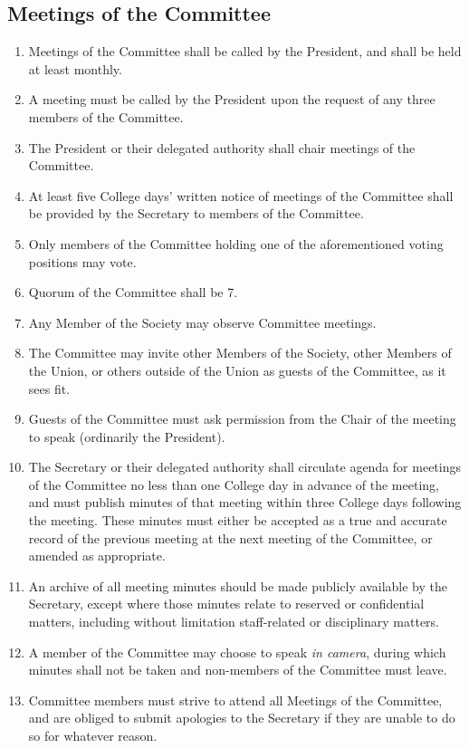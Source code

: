 \documentclass[a4paper]{tufte-handout}
\newcommand{\policyOffset}{12pt}
\newcommand{\policyBye}[2][\policyOffset]{\marginnote[#1]{\textsc{Bye-laws \S#2}}}
\begin{document}
\subsection{Meetings of the Committee}
\begin{enumerate}[resume]
    \item Meetings of the Committee shall be called by the President, and shall be held at least monthly.
    \item A meeting must be called by the President upon the request of any three members of the Committee.
    \item The President or their delegated authority shall chair meetings of the Committee.
    \item At least five College days' written notice of meetings of the Committee shall be provided by the Secretary to members of the Committee.
    \item Only members of the Committee holding one of the aforementioned voting positions may vote.
    \item \policyBye{B11} Quorum of the Committee shall be 7.
    \item Any Member of the Society may observe Committee meetings.
    \item The Committee may invite other Members of the Society, other Members of the Union, or others outside of the Union as guests of the Committee, as it sees fit. 
    \item Guests of the Committee must ask permission from the Chair of the meeting to speak (ordinarily the President).
    \item The Secretary or their delegated authority shall circulate agenda for meetings of the Committee no less than one College day in advance of the meeting, and must publish minutes of that meeting within three College days following the meeting. These minutes must either be accepted as a true and accurate record of the previous meeting at the next meeting of the Committee, or amended as appropriate.
    \item An archive of all meeting minutes should be made publicly available by the Secretary, except where those minutes relate to reserved or confidential matters, including without limitation staff-related or disciplinary matters.
    \item A member of the Committee may choose to speak \textit{in camera}, during which minutes shall not be taken and non-members of the Committee must leave.
    \item Committee members must strive to attend all Meetings of the Committee, and are obliged to submit apologies to the Secretary if they are unable to do so for whatever reason.
\end{enumerate}
\end{document}
